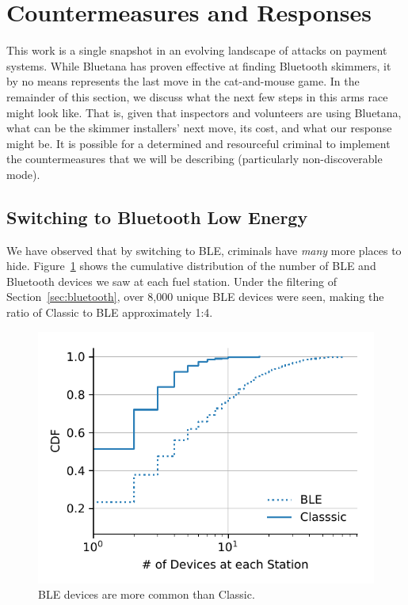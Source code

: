 \section{Countermeasures and Responses}
\label{sec:hiding}
This work is a single snapshot in an evolving landscape of attacks on payment systems. While Bluetana has
proven effective at finding Bluetooth skimmers, it by no means represents the last move in the cat-and-mouse game. In
the remainder of this section, we discuss what the next few steps in this arms race might look like. That is, given
that inspectors and volunteers are using Bluetana, what can be the skimmer installers' next move, its cost, and what our
response might be. It is possible for a determined and resourceful criminal to implement the countermeasures that we will be describing (particularly non-discoverable mode).


\subsection{Switching to Bluetooth Low Energy}
\label{sec:hiding:ble}

We have observed that by switching to BLE, criminals have \emph{many} more places to hide.
%
Figure~\ref{fig:classic-v-ble} shows the cumulative distribution of the number of BLE and Bluetooth devices we saw at each
fuel station.
%
Under the filtering of Section~\ref{sec:bluetooth}, over 8,000 unique BLE devices were seen, making
the ratio of Classic to BLE approximately 1:4.

\begin{figure}
    \centering
    \includegraphics[width=\linewidth]{skimmer/plots/cdf_num_devices_seen.pdf}
    \caption{BLE devices are more common than Classic.}
    \label{fig:classic-v-ble}
    \vspace{-1em}
\end{figure}

